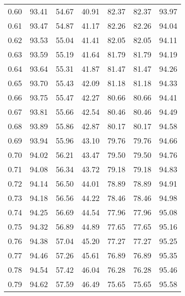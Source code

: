 \begin{tabular}{|c|c|c|c|c|c|c|}
      0.60 &     93.41 &     54.67 &      40.91 &   82.37 &      82.37 &         93.97 \\
      0.61 &     93.47 &     54.87 &      41.17 &   82.26 &      82.26 &         94.04 \\
      0.62 &     93.53 &     55.04 &      41.41 &   82.05 &      82.05 &         94.11 \\
      0.63 &     93.59 &     55.19 &      41.64 &   81.79 &      81.79 &         94.19 \\
      0.64 &     93.64 &     55.31 &      41.87 &   81.47 &      81.47 &         94.26 \\
      0.65 &     93.70 &     55.43 &      42.09 &   81.18 &      81.18 &         94.33 \\
      0.66 &     93.75 &     55.47 &      42.27 &   80.66 &      80.66 &         94.41 \\
      0.67 &     93.81 &     55.66 &      42.54 &   80.46 &      80.46 &         94.49 \\
      0.68 &     93.89 &     55.86 &      42.87 &   80.17 &      80.17 &         94.58 \\
      0.69 &     93.94 &     55.96 &      43.10 &   79.76 &      79.76 &         94.66 \\
      0.70 &     94.02 &     56.21 &      43.47 &   79.50 &      79.50 &         94.76 \\
      0.71 &     94.08 &     56.34 &      43.72 &   79.18 &      79.18 &         94.83 \\
      0.72 &     94.14 &     56.50 &      44.01 &   78.89 &      78.89 &         94.91 \\
      0.73 &     94.18 &     56.56 &      44.22 &   78.46 &      78.46 &         94.98 \\
      0.74 &     94.25 &     56.69 &      44.54 &   77.96 &      77.96 &         95.08 \\
      0.75 &     94.32 &     56.89 &      44.89 &   77.65 &      77.65 &         95.16 \\
      0.76 &     94.38 &     57.04 &      45.20 &   77.27 &      77.27 &         95.25 \\
      0.77 &     94.46 &     57.26 &      45.61 &   76.89 &      76.89 &         95.35 \\
      0.78 &     94.54 &     57.42 &      46.04 &   76.28 &      76.28 &         95.46 \\
      0.79 &     94.62 &     57.59 &      46.49 &   75.65 &      75.65 &         95.58 \\

\end{tabular}
